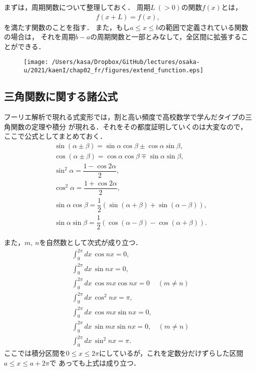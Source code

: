 まずは，周期関数について整理しておく．
周期$L~(>0)$の関数$f(x)$とは，
\begin{align}
  f\left(x + L\right) = f\left(x\right), 
\end{align}
を満たす関数のことを指す．
また，もし$a\leq x \leq b$の範囲で定義されている関数の場合は，
それを周期$b-a$の周期関数と一部とみなして，全区間に拡張することができる．
%
\begin{figure}[htbp]
  \texttt{[image: /Users/kasa/Dropbox/GitHub/lectures/osaka-u/2021/kaenI/chap02\_fr/figures/extend\_function.eps]} 
\end{figure}
%
\subsection{三角関数に関する諸公式}
%
フーリエ解析で現れる式変形では，割と高い頻度で高校数学で学んだタイプの三角関数の定理や積分
が現れる．それをその都度証明していくのは大変なので，ここで公式としてまとめておく．
\begin{align}
 &\sin\left(\alpha \pm \beta\right) = \sin\alpha \cos \beta \pm \cos\alpha \sin\beta, \\
 &\cos\left(\alpha \pm \beta\right) = \cos\alpha \cos \beta \mp \sin\alpha \sin\beta, \\
 &\sin^{2} \alpha = \dfrac{1-\cos 2\alpha}{2}, \\
 &\cos^{2} \alpha = \dfrac{1+\cos 2\alpha}{2}, \\
 &\sin \alpha \cos \beta = \dfrac{1}{2}\left(\sin(\alpha+\beta)+\sin\left(\alpha -\beta\right)\right), \label{tri_formula_01} \\
 &\sin \alpha \sin \beta = \dfrac{1}{2}\left(\cos(\alpha-\beta) - \cos(\alpha+\beta)\right). \label{tri_formula_02} 
\end{align}

また，$m,~n$を自然数として次式が成り立つ．
\begin{align}
 &\int_{0}^{2\pi}dx\,\cos nx = 0,  \label{tri_intformula_01} \\
 &\int_{0}^{2\pi}dx\,\sin nx = 0,  \label{tri_intformula_02} \\
 &\int_{0}^{2\pi}dx\,\cos mx \cos nx = 0\, \quad (m\neq n) \label{tri_intformula_03} \\
 &\int_{0}^{2\pi}dx\,\cos^{2} nx = \pi, \label{tri_intformula_04} \\
 &\int_{0}^{2\pi}dx\,\cos mx \sin nx = 0, \label{tri_intformula_05} \\
 &\int_{0}^{2\pi}dx\,\sin mx \sin nx = 0, \quad (m\neq n) \label{tri_intformula_06} \\
 &\int_{0}^{2\pi}dx\,\sin^{2} nx = \pi. \label{tri_intformula_07}
\end{align}
ここでは積分区間を$0\leq x \leq 2\pi$にしているが，これを定数分だけずらした区間$a\leq x \leq a + 2\pi$で
あっても上式は成り立つ．
%
